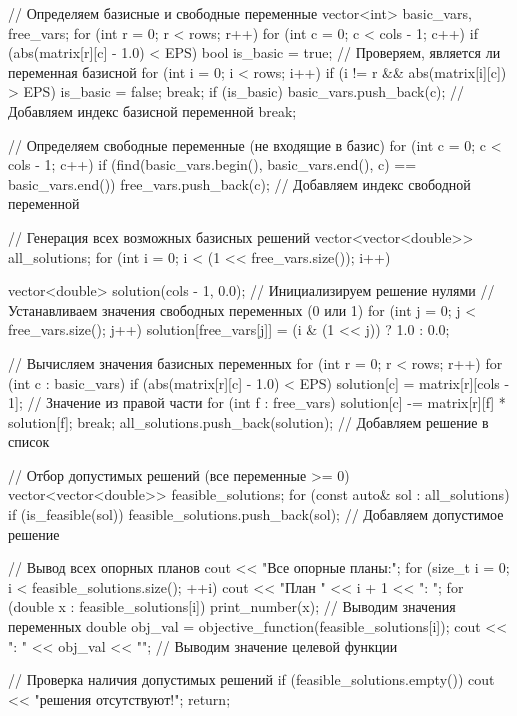 \documentclass{report}
\begin{document}
\begin{code}
{			// Определяем базисные и свободные переменные
			vector<int> basic_vars, free_vars;
			for (int r = 0; r < rows; r++) {
				for (int c = 0; c < cols - 1; c++) {
					if (abs(matrix[r][c] - 1.0) < EPS) {
						bool is_basic = true;
						// Проверяем, является ли переменная базисной
						for (int i = 0; i < rows; i++) {
							if (i != r && abs(matrix[i][c]) > EPS) {
								is_basic = false;
								break;
							}
						}
						if (is_basic) {
							basic_vars.push_back(c); // Добавляем индекс базисной переменной
							break;
						}
					}
				}
			}
			
			// Определяем свободные переменные (не входящие в базис)
			for (int c = 0; c < cols - 1; c++) {
				if (find(basic_vars.begin(), basic_vars.end(), c) == basic_vars.end()) {
					free_vars.push_back(c); // Добавляем индекс свободной переменной
				}
			}
			
			// Генерация всех возможных базисных решений
			vector<vector<double>> all_solutions;
			for (int i = 0; i < (1 << free_vars.size()); i++) {
				vector<double> solution(cols - 1, 0.0); // Инициализируем решение нулями
				// Устанавливаем значения свободных переменных (0 или 1)
				for (int j = 0; j < free_vars.size(); j++) {
					solution[free_vars[j]] = (i & (1 << j)) ? 1.0 : 0.0;
				}
				
				// Вычисляем значения базисных переменных
				for (int r = 0; r < rows; r++) {
					for (int c : basic_vars) {
						if (abs(matrix[r][c] - 1.0) < EPS) {
							solution[c] = matrix[r][cols - 1]; // Значение из правой части
							for (int f : free_vars) {
								solution[c] -= matrix[r][f] * solution[f]; 
							}
							break;
						}
					}
				}
				all_solutions.push_back(solution); // Добавляем решение в список
			}
			
			// Отбор допустимых решений (все переменные >= 0)
			vector<vector<double>> feasible_solutions;
			for (const auto& sol : all_solutions) {
				if (is_feasible(sol)) {
					feasible_solutions.push_back(sol); // Добавляем допустимое решение
				}
			}
			
			// Вывод всех опорных планов
			cout << "Все опорные планы:\n";
			for (size_t i = 0; i < feasible_solutions.size(); ++i) {
				cout << "План " << i + 1 << ": ";
				for (double x : feasible_solutions[i]) {
					print_number(x); // Выводим значения переменных
				}
				double obj_val = objective_function(feasible_solutions[i]);
				cout << ": " << obj_val << "\n"; // Выводим значение целевой функции
			}
			
			// Проверка наличия допустимых решений
			if (feasible_solutions.empty()) {
				cout << " решения отсутствуют!\n";
				return;
			}
			
}
\end{code}
\end{document}

